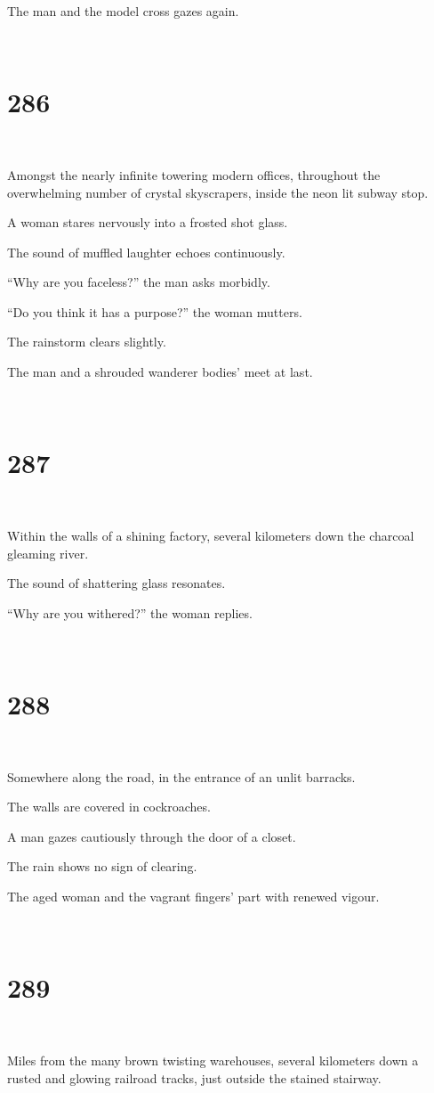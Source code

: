 \documentclass{report}
\begin{document}
The man and the model cross gazes again.

~
\chapter*{286}
~

Amongst the nearly infinite towering modern offices, throughout the overwhelming number of crystal skyscrapers, inside the neon lit subway stop.

A woman stares nervously into a frosted shot glass.

The sound of muffled laughter echoes continuously.

``Why are you faceless?'' the man asks morbidly.

``Do you think it has a purpose?'' the woman mutters.

The rainstorm clears slightly.

The man and a shrouded wanderer bodies' meet at last.

~
\chapter*{287}
~

Within the walls of a shining factory, several kilometers down the charcoal gleaming river.

The sound of shattering glass resonates.

``Why are you withered?'' the woman replies.

~
\chapter*{288}
~

Somewhere along the road, in the entrance of an unlit barracks.

The walls are covered in cockroaches.

A man gazes cautiously through the door of a closet.

The rain shows no sign of clearing.

The aged woman and the vagrant fingers' part with renewed vigour.

~
\chapter*{289}
~

Miles from the many brown twisting warehouses, several kilometers down a rusted and glowing railroad tracks, just outside the stained stairway.
\end{document}
